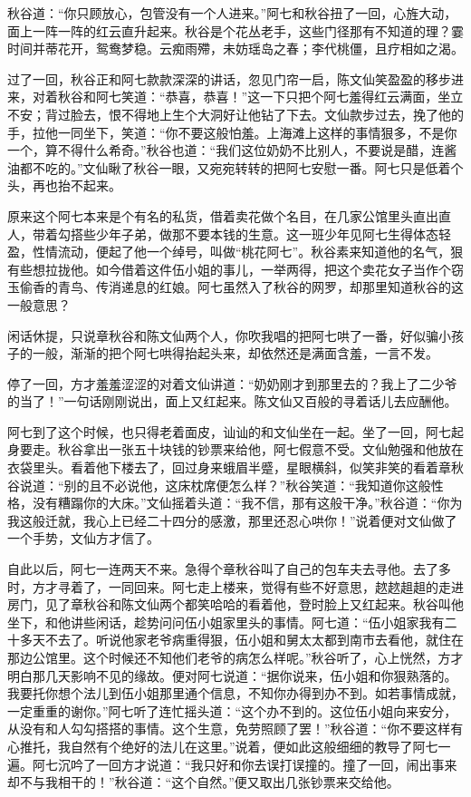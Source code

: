 \documentclass[12pt,UTF8]{ctexbook}
\begin{document}
{{{秋谷道：“你只顾放心，包管没有一个人进来。”阿七和秋谷扭了一回，心旌大动，面上一阵一阵的红云直升起来。秋谷是个花丛老手，这些门径那有不知道的理？霎时间并蒂花开，鸳鸯梦稳。云痴雨殢，未妨瑶岛之春；李代桃僵，且疗相如之渴。

过了一回，秋谷正和阿七款款深深的讲话，忽见门帘一启，陈文仙笑盈盈的移步进来，对着秋谷和阿七笑道：“恭喜，恭喜！”这一下只把个阿七羞得红云满面，坐立不安；背过脸去，恨不得地上生个大洞好让他钻了下去。文仙款步过去，挽了他的手，拉他一同坐下，笑道：“你不要这般怕羞。上海滩上这样的事情狠多，不是你一个，算不得什么希奇。”秋谷也道：“我们这位奶奶不比别人，不要说是醋，连酱油都不吃的。”文仙瞅了秋谷一眼，又宛宛转转的把阿七安慰一番。阿七只是低着个头，再也抬不起来。

原来这个阿七本来是个有名的私货，借着卖花做个名目，在几家公馆里头直出直人，带着勾搭些少年子弟，做那不要本钱的生意。这一班少年见阿七生得体态轻盈，性情流动，便起了他一个绰号，叫做“桃花阿七”。秋谷素来知道他的名气，狠有些想拉拢他。如今借着这件伍小姐的事儿，一举两得，把这个卖花女子当作个窃玉偷香的青鸟、传消递息的红娘。阿七虽然入了秋谷的网罗，却那里知道秋谷的这一般意思？

闲话休提，只说章秋谷和陈文仙两个人，你吹我唱的把阿七哄了一番，好似骗小孩子的一般，渐渐的把个阿七哄得抬起头来，却依然还是满面含羞，一言不发。

停了一回，方才羞羞涩涩的对着文仙讲道：“奶奶刚才到那里去的？我上了二少爷的当了！”一句话刚刚说出，面上又红起来。陈文仙又百般的寻着话儿去应酬他。

阿七到了这个时候，也只得老着面皮，讪讪的和文仙坐在一起。坐了一回，阿七起身要走。秋谷拿出一张五十块钱的钞票来给他，阿七假意不受。文仙勉强和他放在衣袋里头。看着他下楼去了，回过身来蛾眉半蹙，星眼横斜，似笑非笑的看着章秋谷说道：“别的且不必说他，这床枕席便怎么样？”秋谷笑道：“我知道你这般性格，没有糟蹋你的大床。”文仙摇着头道：“我不信，那有这般干净。”秋谷道：“你为我这般迁就，我心上已经二十四分的感激，那里还忍心哄你！”说着便对文仙做了一个手势，文仙方才信了。

自此以后，阿七一连两天不来。急得个章秋谷叫了自己的包车夫去寻他。去了多时，方才寻着了，一同回来。阿七走上楼来，觉得有些不好意思，趑趑趄趄的走进房门，见了章秋谷和陈文仙两个都笑哈哈的看着他，登时脸上又红起来。秋谷叫他坐下，和他讲些闲话，趁势问问伍小姐家里头的事情。阿七道：“伍小姐家我有二十多天不去了。听说他家老爷病重得狠，伍小姐和舅太太都到南市去看他，就住在那边公馆里。这个时候还不知他们老爷的病怎么样呢。”秋谷听了，心上恍然，方才明白那几天影响不见的缘故。便对阿七说道：“据你说来，伍小姐和你狠熟落的。我要托你想个法儿到伍小姐那里通个信息，不知你办得到办不到。如若事情成就，一定重重的谢你。”阿七听了连忙摇头道：“这个办不到的。这位伍小姐向来安分，从没有和人勾勾搭搭的事情。这个生意，免劳照顾了罢！”秋谷道：“你不要这样有心推托，我自然有个绝好的法儿在这里。”说着，便如此这般细细的教导了阿七一遍。阿七沉吟了一回方才说道：“我只好和你去误打误撞的。撞了一回，闹出事来却不与我相干的！”秋谷道：“这个自然。”便又取出几张钞票来交给他。

}}}
\end{document}
